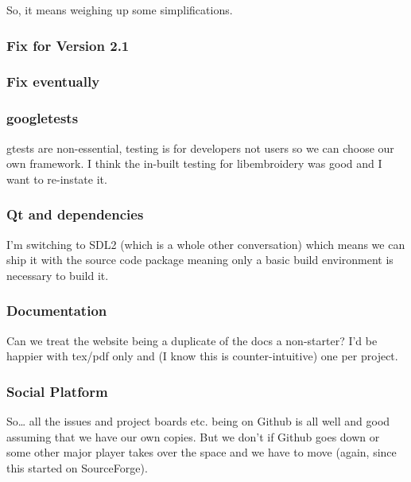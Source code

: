 \documentclass[a4paper, 11pt]{report}
\begin{document}
So, it means weighing up some simplifications.

\hypertarget{fix-for-version-2.1}{%
\subsubsection{Fix for Version 2.1}\label{fix-for-version-2.1}}

\hypertarget{fix-eventually}{%
\subsubsection{Fix eventually}\label{fix-eventually}}

\hypertarget{googletests}{%
\subsubsection{googletests}\label{googletests}}

gtests are non-essential, testing is for developers not users so we can
choose our own framework. I think the in-built testing for libembroidery
was good and I want to re-instate it.

\hypertarget{qt-and-dependencies}{%
\subsubsection{Qt and dependencies}\label{qt-and-dependencies}}

I'm switching to SDL2 (which is a whole other conversation) which means
we can ship it with the source code package meaning only a basic build
environment is necessary to build it.

\hypertarget{documentation}{%
\subsubsection{Documentation}\label{documentation}}

Can we treat the website being a duplicate of the docs a non-starter?
I'd be happier with tex/pdf only and (I know this is counter-intuitive)
one per project.

\hypertarget{social-platform}{%
\subsubsection{Social Platform}\label{social-platform}}

So\ldots{} all the issues and project boards etc. being on Github is all
well and good assuming that we have our own copies. But we don't if
Github goes down or some other major player takes over the space and we
have to move (again, since this started on SourceForge).
\end{document}

